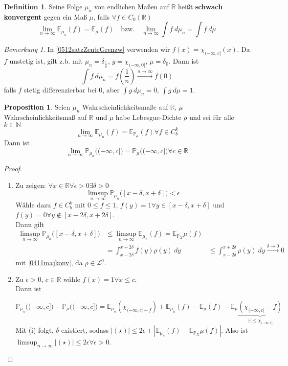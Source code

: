 \documentclass[10pt,a4paper]{article}
\newcommand{\N}{\ensuremath{\mathbb{N}}}
\newcommand{\R}{\ensuremath{\mathbb{R}}}
\newcommand{\abs}[1]{\left|#1\right|}
\newcommand{\Prb}{\mathbb P}
\newcommand{\Epv}{\ensuremath{\mathbb{E}}}
\newcommand{\scL}{\mathscr L}
\theoremstyle{plain}
\theoremstyle{definition}
\newtheorem{definition}[theorem]{Definition}
\newtheorem{prop}[theorem]{Proposition}
\theoremstyle{remark}
\newtheorem*{bem*}{Bemerkung}
\begin{document}
	\begin{definition}
		Seine Folge $\mu_n$ von endlichen Maßen auf $\R$ heißt \textbf{schwach konvergent} gegen ein Maß $\mu$, falls $\forall f\in C_0(\R)$
		\[\lim\limits_{n\to\infty}\Epv_{\mu_n}(f)=\Epv_{\mu}(f)\quad\text{bzw.}\quad\lim\limits_{n\to\infty}\int f~d\mu_n=\int f~d\mu\]
	\end{definition}
	
	\begin{bem*}
		In \ref{0512satzZentrGrenzw} verwenden wir $f(x)=\chi_{(-\infty,c]}(x)$. Da $f$ unstetig ist, gilt z.b. mit $\mu_n=\delta_{\frac{1}{n}}$, $g=\chi_{(-\infty,0]}$, $\mu=\delta_0$. Dann ist
		\[\int f~d\mu_n=f\left(\frac{1}{n}\right)\xrightarrow{n\to\infty}f(0)\]
		falls $f$ stetig differenzierbar bei $0$, aber $\int g~d\mu_n=0$, $\int g~d\mu=1$.
	\end{bem*}

	\begin{prop}\label{0515prop}
		Seien $\mu_n$ Wahrscheinlichkeitsmaße auf $\R$, $\mu$ Wahrscheinlichkeitsmaß auf $\R$ und $\mu$ habe Lebesgue-Dichte $\rho$ und sei für alle $k\in\N$
		\[\lim\limits_{n\to\infty}\Epv_{\mu_n}(f)=\Epv_{\Prb_\mu}(f)\forall f\in C_b^k\]
		Dann ist
		\[\lim\limits_{n\to\infty}\Prb_{\mu_n}\big((-\infty,c]\big)=\Prb_\mu\big((-\infty,c]\big)\forall c\in\R\]
	\end{prop}
	\begin{proof}
		\begin{enumerate}[label=(\roman*)]
			\item Zu zeigen: $\forall x\in\R\forall\epsilon>0\exists\delta>0$
			\[\limsup_{n\to\infty}\Prb_{\mu_n}\big([x-\delta,x+\delta]\big)<\epsilon\]
			Wähle dazu $f\in C_b^k$ mit $0\leq f\leq 1$, $f(y)=1\forall y\in[x-\delta,x+\delta]$ und $f(y)=0\forall y\notin[x-2\delta,x+2\delta]$.\\
			Dann gilt
			\begin{align*}
			\limsup_{n\to\infty} \Prb_{\mu_n}\big([x-\delta,x+\delta]\big)&\leq \limsup_{n\to\infty} \Epv_{\mu_n}(f)=\Epv_{\Prb_X}\mu(f)\\
			&=\int_{x-2\delta}^{x+2\delta}f(y)\rho(y)~dy&\leq \int_{x-2\delta}^{x+2\delta}\rho(y)~dy\xrightarrow{\delta\to 0}0
			\end{align*}
			mit \ref{0411majkonv}, da $\rho\in\scL^1$.
			\item Zu $\epsilon>0$, $c\in\R$ wähle $f(x)=1\forall x\leq c$.\\
			Dann ist
			
			\[\Prb_{\mu_n}\big((-\infty,c]\big)-\Prb_\mu\big((-\infty,c]\big)=\Epv_{\mu_n}\left(\chi_{(-\infty,c]-f}\right)\tag{\star}+\Epv_{\mu_n}(f)-\Epv_{\mu}(f)-\Epv_\mu\underbrace{\left(\chi_{(-\infty,c]}-f\right)}_{|\cdot|\leq\chi_{(-\infty,c]}}\]
			Mit (i) folgt, $\delta$ existiert, sodass $|(\star)|\leq 2\epsilon+\abs{\Epv_{\mu_n}(f)-\Epv_{\Prb_X}\mu(f)}$.
			Also ist $\limsup_{n\to\infty}\abs{(\star)}\leq 2\epsilon\forall\epsilon>0$.
		\end{enumerate}
	\end{proof}
\end{document}
